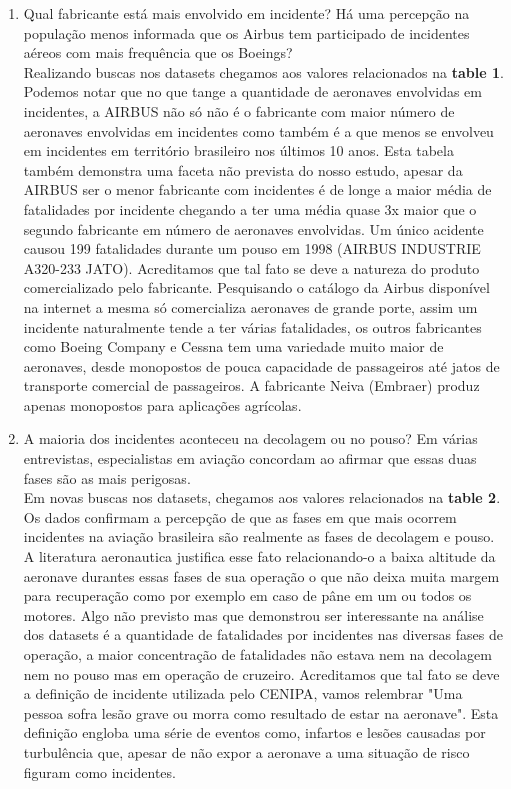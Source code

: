 \documentclass[conference]{IEEEtran}
\begin{document}
\begin{enumerate}
 \item Qual fabricante está mais envolvido em incidente? Há uma percepção na população menos informada que os Airbus tem participado de incidentes aéreos com mais frequência
 que os Boeings?\\
 
 Realizando buscas nos datasets chegamos aos valores relacionados na \textbf{table 1}. Podemos notar que no que tange a quantidade de aeronaves envolvidas em incidentes,
 a AIRBUS não só não é o fabricante com maior número de aeronaves envolvidas em incidentes como também é a que menos se envolveu em incidentes em território brasileiro nos últimos
 10 anos. Esta tabela também demonstra uma faceta não prevista do nosso estudo, apesar da AIRBUS ser o menor fabricante com incidentes é de longe a maior média de fatalidades 
 por incidente chegando a ter uma média quase 3x maior que o segundo fabricante em número de aeronaves envolvidas. Um único acidente causou 199 fatalidades durante um pouso em 1998 
 (AIRBUS INDUSTRIE A320-233 JATO). Acreditamos que tal fato se deve a natureza do produto comercializado pelo fabricante. Pesquisando o catálogo da Airbus disponível na 
 internet a mesma só comercializa aeronaves de grande porte, assim um incidente naturalmente tende a ter várias fatalidades, os outros fabricantes como Boeing Company e Cessna 
 tem uma variedade muito maior de aeronaves, desde monopostos de pouca capacidade de passageiros até jatos de transporte comercial de passageiros. A fabricante Neiva 
 (Embraer) produz apenas monopostos para aplicações agrícolas.\\
 
 \item A maioria dos incidentes aconteceu na decolagem ou no pouso? Em várias entrevistas, especialistas em aviação concordam ao afirmar que essas duas fases são as
 mais perigosas.\\
 
 Em novas buscas nos datasets, chegamos aos valores relacionados na \textbf{table 2}. Os dados confirmam a percepção de que as fases em que mais ocorrem incidentes na
 aviação brasileira são realmente as fases de decolagem e pouso. A literatura aeronautica justifica esse fato relacionando-o a baixa altitude da aeronave durantes essas
 fases de sua operação o que não deixa muita margem para recuperação como por exemplo em caso de pâne em um ou todos os motores. Algo não previsto mas que demonstrou ser
 interessante na análise dos datasets é a quantidade de fatalidades por incidentes nas diversas fases de operação, a maior concentração de fatalidades não estava nem na
 decolagem nem no pouso mas em operação de cruzeiro. Acreditamos que tal fato se deve a definição de incidente utilizada pelo CENIPA, vamos relembrar "Uma pessoa sofra 
 lesão grave ou morra como resultado de estar na aeronave". Esta definição engloba uma série de eventos como, infartos e lesões causadas por turbulência que, apesar de não
 expor a aeronave a uma situação de risco figuram como incidentes.\\
 

\end{enumerate}
\end{document}
